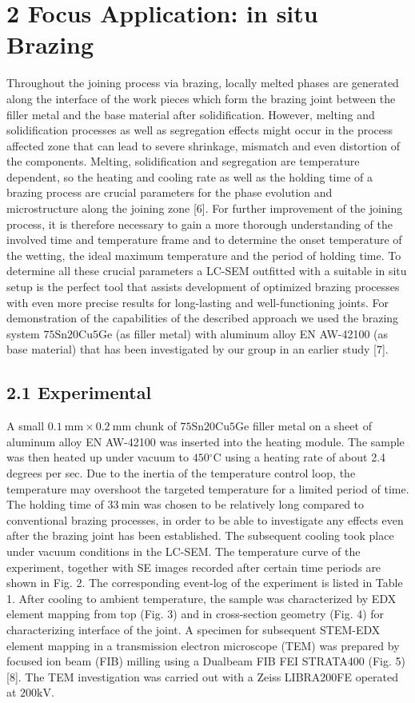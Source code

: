 \documentclass[10pt]{article}
\begin{document}
\section*{2 Focus Application: in situ Brazing}
Throughout the joining process via brazing, locally melted phases are generated along the interface of the work pieces which form the brazing joint between the filler metal and the base material after solidification. However, melting and solidification processes as well as segregation effects might occur in the process affected zone that can lead to severe shrinkage, mismatch and even distortion of the components. Melting, solidification and segregation are temperature dependent, so the heating and cooling rate as well as the holding time of a brazing process are crucial parameters for the phase evolution and\\
microstructure along the joining zone [6]. For further improvement of the joining process, it is therefore necessary to gain a more thorough understanding of the involved time and temperature frame and to determine the onset temperature of the wetting, the ideal maximum temperature and the period of holding time. To determine all these crucial parameters a LC-SEM outfitted with a suitable in situ setup is the perfect tool that assists development of optimized brazing processes with even more precise results for long-lasting and well-functioning joints. For demonstration of the capabilities of the described approach we used the brazing system $75 \mathrm{Sn} 20 \mathrm{Cu} 5 \mathrm{Ge}$ (as filler metal) with aluminum alloy EN AW-42100 (as base material) that has been investigated by our group in an earlier study [7].

\subsection*{2.1 Experimental}
A small $0.1 \mathrm{~mm} \times 0.2 \mathrm{~mm}$ chunk of $75 \mathrm{Sn} 20 \mathrm{Cu} 5 \mathrm{Ge}$ filler metal on a sheet of aluminum alloy EN AW-42100 was inserted into the heating module. The sample was then heated up under vacuum to $450{ }^{\circ} \mathrm{C}$ using a heating rate of about 2.4 degrees per sec. Due to the inertia of the temperature control loop, the temperature may overshoot the targeted temperature for a limited period of time. The holding time of $33 \mathrm{~min}$ was chosen to be relatively long compared to conventional brazing processes, in order to be able to investigate any effects even after the brazing joint has been established. The subsequent cooling took place under vacuum conditions in the LC-SEM. The temperature curve of the experiment, together with SE images recorded after certain time periods are shown in Fig. 2. The corresponding event-log of the experiment is listed in Table 1. After cooling to ambient temperature, the sample was characterized by EDX element mapping from top (Fig. 3) and in cross-section geometry (Fig. 4) for characterizing interface of the joint. A specimen for subsequent STEM-EDX element mapping in a transmission electron microscope (TEM) was prepared by focused ion beam (FIB) milling using a Dualbeam FIB FEI STRATA400 (Fig. 5) [8]. The TEM investigation was carried out with a Zeiss LIBRA200FE operated at $200 \mathrm{kV}$.
\end{document}

